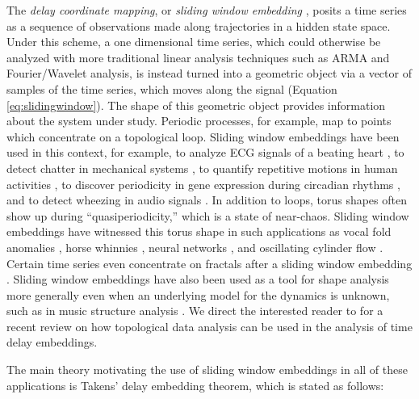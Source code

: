 \documentclass[11pt]{article}
\newcommand{\boyanedit}[1]{\textcolor{red}{(#1)}}
\theoremstyle{definition}
\theoremstyle{remark}
\begin{document}
    The \emph{delay coordinate mapping}, or \emph{sliding window embedding} \cite{takens1981detecting, nolte2010tangled, kantz2004nonlinear, das2017delay},  posits a time series as a sequence of observations made along trajectories in a hidden state space.  Under this scheme, a one dimensional time series, which could otherwise be analyzed with more traditional linear analysis techniques such as ARMA and Fourier/Wavelet analysis, is instead turned into a geometric object via a vector of samples of the time series, which moves along the signal (Equation \ref{eq:slidingwindow}). The shape of this geometric object provides information about the system under study.  Periodic processes, for example, map to points which concentrate on a topological loop.  Sliding window embeddings have been used in this context, for example, to analyze ECG signals of a beating heart \cite{stam2005nonlinear, plesnik2014detection}, to detect chatter in mechanical systems \cite{khasawneh2016chatter}, to quantify repetitive motions in human activities \cite{frank2010activity,venkataraman2016persistent}, to discover periodicity in gene expression during circadian rhythms \cite{perea2015sw1pers}, and to detect wheezing in audio signals \cite{emrani2014real}.  In addition to loops, torus shapes often show up during ``quasiperiodicity,'' which is a state of near-chaos.  Sliding window embeddings have witnessed this torus shape in such applications as vocal fold anomalies \cite{herzel1994analysis}, horse whinnies \cite{briefer2015segregation}, neural networks \cite{morrison2016diversity}, and oscillating cylinder flow \cite{glaz2017quasi}.  Certain time series even concentrate on fractals after a sliding window embedding \cite{takens1981detecting, de2012topological}.  Sliding window embeddings have also been used as a tool for shape analysis more generally even when an underlying model for the dynamics is unknown, such as in music structure analysis \cite{bello2011measuring, serra2009cross}.
    We direct the interested reader to 
    \cite{perea2019topological} for a recent review on how topological data analysis can be used in the analysis of time delay embeddings.

    The main theory motivating the use of sliding window embeddings in all of these applications is Takens' delay embedding \cite{takens1981detecting} theorem, which is stated as follows:
\end{document}
